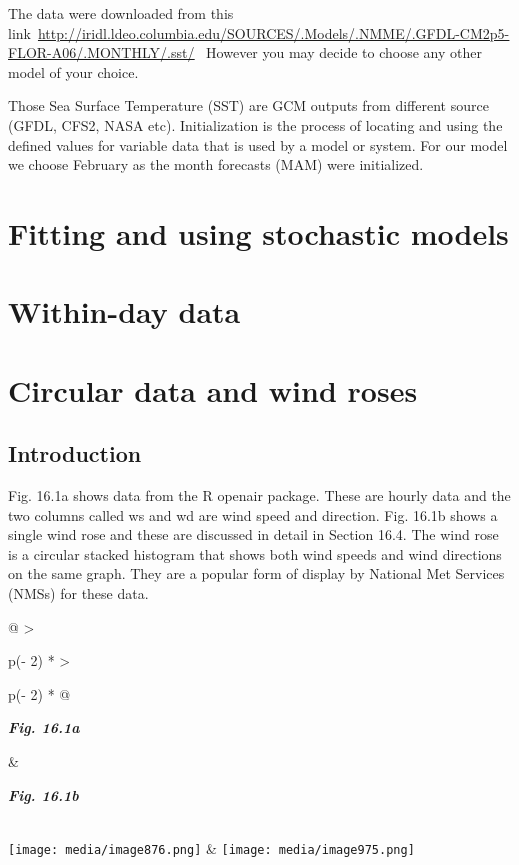 \documentclass[
  letterpaper,
  DIV=11,
  numbers=noendperiod]{scrreprt}
\begin{document}
The data were downloaded from this
link~\href{http://iridl.ldeo.columbia.edu/SOURCES/.Models/.NMME/.GFDL-CM2p5-FLOR-A06/.MONTHLY/.sst/}{\ul{http://iridl.ldeo.columbia.edu/SOURCES/.Models/.NMME/.GFDL-CM2p5-FLOR-A06/.MONTHLY/.sst/}}~
However you may decide to choose any other model of your choice.~~

Those Sea Surface Temperature (SST) are GCM outputs from different
source (GFDL, CFS2, NASA etc). Initialization is the process of locating
and using the defined values for variable data that is used by a model
or system. For our model we choose February as the month forecasts (MAM)
were initialized.


\chapter{Fitting and using stochastic
models}\label{fitting-and-using-stochastic-models}


\chapter{Within-day data}\label{within-day-data}


\chapter{Circular data and wind
roses}\label{circular-data-and-wind-roses}

\section{Introduction}\label{introduction-13}

Fig. 16.1a shows data from the R openair package. These are hourly data
and the two columns called ws and wd are wind speed and direction. Fig.
16.1b shows a single wind rose and these are discussed in detail in
Section 16.4. The wind rose is a circular stacked histogram that shows
both wind speeds and wind directions on the same graph. They are a
popular form of display by National Met Services (NMSs) for these data.

\begin{longtable}[]{@{}
  >{\raggedright\arraybackslash}p{(\columnwidth - 2\tabcolsep) * }
  >{\raggedright\arraybackslash}p{(\columnwidth - 2\tabcolsep) * }@{}}
\toprule\noalign{}
\begin{minipage}[b]{\linewidth}\raggedright
\textbf{\emph{Fig. 16.1a}}
\end{minipage} & \begin{minipage}[b]{\linewidth}\raggedright
\textbf{\emph{Fig. 16.1b}}
\end{minipage} \\
\midrule\noalign{}
\endhead
\bottomrule\noalign{}
\endlastfoot
\texttt{[image: media/image876.png]} &
\texttt{[image: media/image975.png]} \\
\end{longtable}
\end{document}
